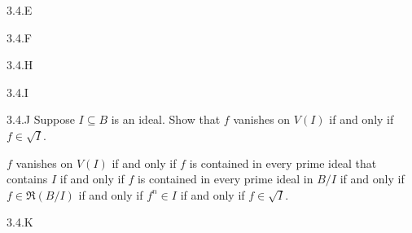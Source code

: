 \begin{exercise}{3.4.E}

\end{exercise}
\begin{solution}
    \todo{}
\end{solution}

\begin{exercise}{3.4.F}

\end{exercise}
\begin{solution}
    \todo{}
\end{solution}

\begin{exercise}{3.4.H}

\end{exercise}
\begin{solution}
    \todo{}
\end{solution}

\begin{exercise}{3.4.I}

\end{exercise}
\begin{solution}
    \todo{}
\end{solution}

\begin{exercise}{3.4.J}
    Suppose $I \subseteq B$ is an ideal. Show that $f$ vanishes on $V(I)$ if and only if $f \in \sqrt{I}$. 
\end{exercise}
\begin{solution}
    $f$ vanishes on $V(I)$ if and only if $f$ is contained in every prime ideal that contains $I$ if and only if $f$ is contained in every prime ideal in $B/I$ if and only if $f \in \mathfrak R(B/I)$ if and only if $f^n \in I$ if and only if $f \in \sqrt{I}$. 
\end{solution}

\begin{exercise}{3.4.K}

\end{exercise}
\begin{solution}
    \todo{}
\end{solution}

